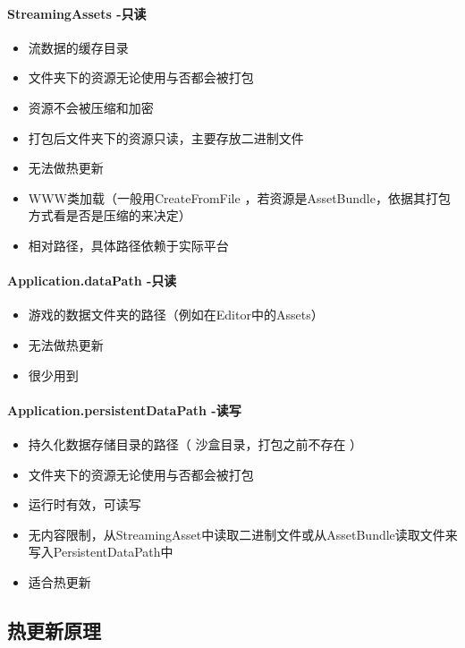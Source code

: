 \documentclass[UTF8,a4paper,12pt]{ctexbook}
\begin{document}
			\paragraph{StreamingAssets -只读}
				\begin{itemize}
					\item 流数据的缓存目录
					\item 文件夹下的资源无论使用与否都会被打包
					\item 资源不会被压缩和加密
					\item 打包后文件夹下的资源只读，主要存放二进制文件
					\item 无法做热更新
					\item WWW类加载（一般用CreateFromFile ，若资源是AssetBundle，依据其打包方式看是否是压缩的来决定）
					\item 相对路径，具体路径依赖于实际平台
				\end{itemize}
				
			\paragraph{Application.dataPath -只读}
				\begin{itemize}
					\item 游戏的数据文件夹的路径（例如在Editor中的Assets）
					\item 无法做热更新
					\item 很少用到
				\end{itemize}
			
			\paragraph{Application.persistentDataPath -读写}
				\begin{itemize}
					\item 持久化数据存储目录的路径（ 沙盒目录，打包之前不存在 ）
					\item 文件夹下的资源无论使用与否都会被打包
					\item 运行时有效，可读写
					\item 无内容限制，从StreamingAsset中读取二进制文件或从AssetBundle读取文件来写入PersistentDataPath中
					\item 适合热更新
				\end{itemize}
		
		\subsection{热更新原理}
				
\end{document}
